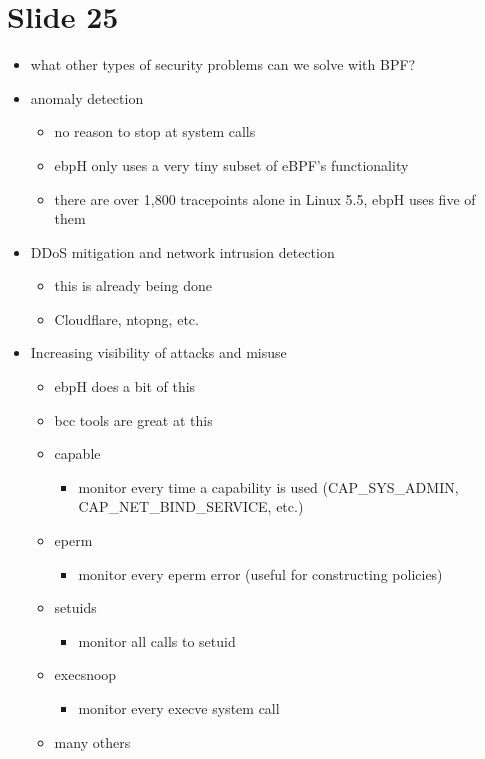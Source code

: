 \documentclass[
  12pt]{findlay}
\providecommand{\tightlist}{\setlength{\itemsep}{0pt}\setlength{\parskip}{0pt}}
\begin{document}
\hypertarget{slide-25}{%
\section{Slide 25}\label{slide-25}}

\begin{itemize}
\tightlist
\item
  what other types of security problems can we solve with BPF?
\item
  anomaly detection

  \begin{itemize}
  \tightlist
  \item
    no reason to stop at system calls
  \item
    ebpH only uses a very tiny subset of eBPF's functionality
  \item
    there are over 1,800 tracepoints alone in Linux 5.5, ebpH uses five
    of them
  \end{itemize}
\item
  DDoS mitigation and network intrusion detection

  \begin{itemize}
  \tightlist
  \item
    this is already being done
  \item
    Cloudflare, ntopng, etc.
  \end{itemize}
\item
  Increasing visibility of attacks and misuse

  \begin{itemize}
  \tightlist
  \item
    ebpH does a bit of this
  \item
    bcc tools are great at this
  \item
    capable

    \begin{itemize}
    \tightlist
    \item
      monitor every time a capability is used (CAP\_SYS\_ADMIN,
      CAP\_NET\_BIND\_SERVICE, etc.)
    \end{itemize}
  \item
    eperm

    \begin{itemize}
    \tightlist
    \item
      monitor every eperm error (useful for constructing policies)
    \end{itemize}
  \item
    setuids

    \begin{itemize}
    \tightlist
    \item
      monitor all calls to setuid
    \end{itemize}
  \item
    execsnoop

    \begin{itemize}
    \tightlist
    \item
      monitor every execve system call
    \end{itemize}
  \item
    many others
  \end{itemize}
\end{itemize}
\end{document}
